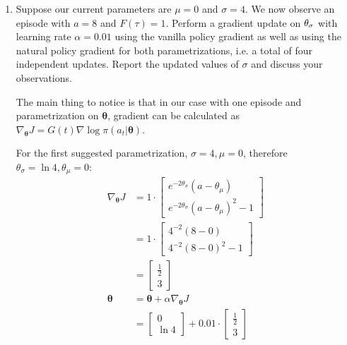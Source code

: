 \documentclass{exam}
\begin{document}
\begin{enumerate}
    \item Suppose our current parameters are $\mu = 0$ and $\sigma = 4$. We now observe an episode with $a = 8$ and $F(\tau) = 1$. Perform a gradient update on $\theta_{\sigma}$ with learning rate $\alpha = 0.01$ using the vanilla policy gradient as well as using the natural policy gradient for both parametrizations, i.e. a total of four independent updates. Report the updated values of $\sigma$ and discuss your observations.
        \begin{solutionorlines}[2in]
        The main thing to notice is that in our case with one episode and parametrization on $\boldsymbol{\theta}$, gradient can be calculated as $\nabla_{\boldsymbol{\theta}} J= G(t) \nabla \log \pi(a_t|\boldsymbol{\theta})$.
        
        For the first suggested parametrization, $\sigma = 4, \mu = 0$, therefore $\theta_{\sigma} = \ln 4, \theta_{\mu} = 0$:
            \begin{align*}
                \nabla_{\boldsymbol{\theta}} J &= 1 \cdot \begin{bmatrix}
                e^{-2\theta_\sigma}(a - \theta_{\mu})\\
                e^{-2\theta_\sigma}(a - \theta_{\mu})^2 - 1
                \end{bmatrix}\\
                &= 1 \cdot \begin{bmatrix}
                4^{-2} (8 - 0)\\
                4^{-2} (8 - 0)^2 - 1
                \end{bmatrix}\\
                &= \begin{bmatrix}
                \frac{1}{2} \\
                3
                \end{bmatrix}\\
                \boldsymbol{\theta} &= \boldsymbol{\theta}  + \alpha  \nabla_{\boldsymbol{\theta}} J \tag{Vanilla policy gradient}\\ &= \begin{bmatrix}
                0\\
                \ln 4
                \end{bmatrix} + 0.01 \cdot  \begin{bmatrix}
                \frac{1}{2}\\
                3
                \end{bmatrix} \\

\end{align*}
\end{solutionorlines}
\end{enumerate}
\end{document}
